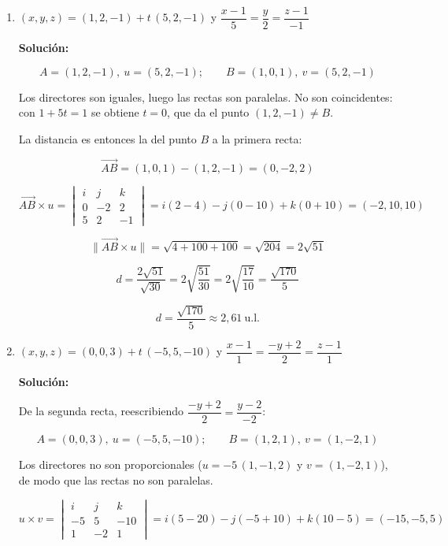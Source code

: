\documentclass[12pt]{article}
\newcommand{\solucion}{%
    \vspace{0.8em}%
    \textbf{Solución:}%
    \vspace{0.8em}%
}
\begin{document}
\begin{enumerate}[label=\alph*.-]

    \item $(x,y,z)=(1,2,-1)+t\,(5,2,-1)$ \quad y \quad
    $\dfrac{x-1}{5}=\dfrac{y}{2}=\dfrac{z-1}{-1}$

    \solucion

    \[
    A=(1,2,-1),\ u=(5,2,-1);\qquad B=(1,0,1),\ v=(5,2,-1)
    \]

    Los directores son iguales, luego las rectas son paralelas. No son
    coincidentes: con $1+5t=1$ se obtiene $t=0$, que da el punto
    $(1,2,-1)\neq B$.

    La distancia es entonces la del punto $B$ a la primera recta:

    \[
    \overrightarrow{AB}=(1,0,1)-(1,2,-1)=(0,-2,2)
    \]

    \[
    \overrightarrow{AB}\times u=\begin{vmatrix}
    i & j & k\\
    0 & -2 & 2\\
    5 & 2 & -1
    \end{vmatrix}
    =i(2-4)-j(0-10)+k(0+10)=(-2,10,10)
    \]

    \[
    \big\|\overrightarrow{AB}\times u\big\|=\sqrt{4+100+100}=\sqrt{204}
    =2\sqrt{51}
    \]

    \[
    d=\frac{2\sqrt{51}}{\sqrt{30}}=2\sqrt{\frac{51}{30}}
    =2\sqrt{\frac{17}{10}}=\frac{\sqrt{170}}{5}
    \]

    \[
    \boxed{d=\frac{\sqrt{170}}{5}\approx2{,}61\ \text{u.l.}}
    \]

    \item $(x,y,z)=(0,0,3)+t\,(-5,5,-10)$ \quad y \quad
    $\dfrac{x-1}{1}=\dfrac{-y+2}{2}=\dfrac{z-1}{1}$

    \solucion

    De la segunda recta, reescribiendo $\dfrac{-y+2}{2}=\dfrac{y-2}{-2}$:

    \[
    A=(0,0,3),\ u=(-5,5,-10);\qquad B=(1,2,1),\ v=(1,-2,1)
    \]

    Los directores no son proporcionales
    ($u=-5\,(1,-1,2)$ y $v=(1,-2,1)$), de modo que las rectas no son
    paralelas.

    \[
    u\times v=\begin{vmatrix}
    i & j & k\\
    -5 & 5 & -10\\
    1 & -2 & 1
    \end{vmatrix}
    =i(5-20)-j(-5+10)+k(10-5)=(-15,-5,5)
    \]


\end{enumerate}
\end{document}
